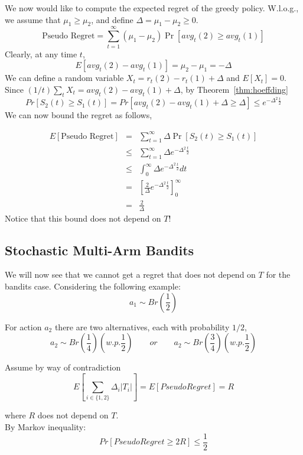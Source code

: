 We now would like to compute the expected regret of the greedy
policy. W.l.o.g., we assume that $\mu_{1}\ge\mu_{2}$, and define
$\Delta=\mu_{1}-\mu_{2}\ge0$.
\[
\text{Pseudo Regret}= \sum_{t=1}^{\infty}(\mu_{1}-\mu_{2})
\Pr\left[avg_{t}(2)\ge avg_{t}(1)\right]
\]
Clearly, at any time $t$,
\[
E[avg_{t}(2)-avg_{t}(1)]=\mu_{2}-\mu_{1}=-\Delta
\]
We can define a random variable $X_t=r_t(2)-r_t(1)+\Delta$ and
$E[X_t]=0$. Since $(1/t)\sum_t X_t = avg_t(2)- avg_t(1)+\Delta$, by
Theorem~\ref{thm:hoeffding}
\[
Pr[S_2(t)\geq S_1(t)]= Pr\left[avg_{t}(2)-avg_{t}(1)+\Delta
\ge\Delta\right]\le e^{-\Delta^{2}\frac{t}{2}}
\]
We can now bound the regret as follows,

\begin{align*}
E\left[\text{Pseudo Regret}\right] & = &
 \sum_{t=1}^{\infty}\Delta\Pr\left[S_{2}(t)\ge S_{1}(t)\right]\\
 & \le &  \sum_{t=1}^{\infty}\Delta e^{-\Delta^{2}\frac{t}{2}}\\
 & \le &  \int_{0}^{\infty}\Delta e^{-\Delta^{2}\frac{t}{2}}dt\\
 & = & \left[\frac{2}{\Delta}e^{-\Delta^{2}\frac{t}{2}}\right]_{0}^{\infty}\\
 & = & \frac{2}{\Delta}
\end{align*}
Notice that this bound does not depend on $T$!

\subsection{Stochastic Multi-Arm Bandits}


We will now see that we cannot get a regret that does not depend on
$T$ for the bandits case. Considering the following example:
\[
a_{1}\sim Br\left(\frac{1}{2}\right)\]

For action $a_2$ there are two alternatives, each with probability
$1/2$,
\[
a_{2}\sim Br\left(\frac{1}{4}\right) \left(w.p. \frac{1}{2}\right)
\qquad or \qquad a_{2}\sim Br\left(\frac{3}{4}\right) \left(w.p.
\frac{1}{2}\right)
\]

Assume by way of contradiction
\[
E\left[ \sum_{i \in \{1,2\}} \Delta_i |T_i|\right] = E\left[Pseudo
Regret\right]=R
\]

where $R$ does not depend on $T$. \\ By Markov inequality:
\[
Pr\left[Pseudo Regret\ge2R\right]\le\frac{1}{2}
\]

